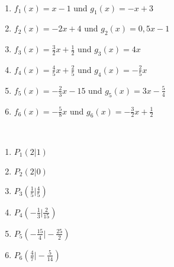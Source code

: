\begin{Exercise}[title={Bestimme jeweils den Schnittpunkt}, label=schnittpunktA1]\\
	\begin{minipage}{0.5\textwidth}
		\begin{enumerate}[label=\alph*)]
			\item $f_1(x)=x-1$ und $g_1(x)=-x+3$
			\item $f_2(x)=-2x+4$ und $g_2(x)=0,5x-1$
			\item $f_3(x)=\frac{3}{2}x+\frac{1}{2}$ und $g_3(x)=4x$
		\end{enumerate}
	\end{minipage}
	\begin{minipage}{0.5\textwidth}
		\begin{enumerate}[label=\alph*)]
			\setcounter{enumi}{3}
			\item $f_4(x)=\frac{4}{5}x+\frac{2}{5}$ und $g_4(x)=-\frac{2}{5}x$
			\item $f_5(x)=-\frac{2}{3}x-15$ und $g_5(x)=3x-\frac{5}{4}$
			\item $f_6(x)=-\frac{5}{8}x$ und $g_6(x)=-\frac{3}{2}x+\frac{1}{2}$
		\end{enumerate}
	\end{minipage}
\end{Exercise}\vspace{.5cm}
\begin{Answer}[ref=schnittpunktA1]\\
	\begin{minipage}{0.5\textwidth}
		\begin{enumerate}[label=\alph*)]
			\item $P_1\left(2\vert 1\right)$
			\item $P_2\left(2\vert 0\right)$
			\item $P_3\left(\frac{1}{5}\vert \frac{4}{5}\right)$
		\end{enumerate}
	\end{minipage}
	\begin{minipage}{0.5\textwidth}
		\begin{enumerate}[label=\alph*)]
			\setcounter{enumi}{3}
			\item $P_4\left(-\frac{1}{3}\vert \frac{2}{15}\right)$
			\item $P_5\left(-\frac{15}{4}\vert -\frac{25}{2}\right)$
			\item $P_6\left(\frac{4}{7}\vert -\frac{5}{14}\right)$
		\end{enumerate}
	\end{minipage}
\end{Answer}